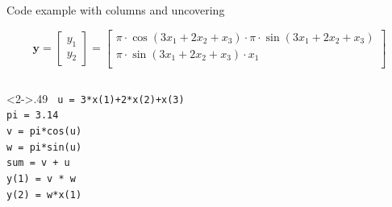 \begin{frame}{Code example with columns and uncovering} 

  \begin{equation*}
    \mathbf{y} = 
  \left[
    \begin{array}{c}
      y_1 \\ y_2
    \end{array}
  \right]
  =
  \left[\begin{array}{l}
 \pi\cdot\cos(3x_1+2x_2+x_3)\cdot\pi\cdot\sin(3x_1+2x_2+x_3)\\   
 \pi\cdot\sin(3x_1+2x_2+x_3)\cdot x_1\\   
  \end{array}\right]
  \end{equation*}

  \vfill
  \begin{columns}
    \begin{column}<2->{.49\textwidth}
      {\small\tt
        u = 3*x(1)+2*x(2)+x(3) \\
        pi = 3.14 \\
        v = pi*cos(u) \\
        w = pi*sin(u) \\
        sum = v + u \\
        y(1) = v * w \\
        y(2) = w*x(1) \\
      }
    \end{column}
%
    \begin{column}{.49\textwidth}
      {\small\tt
      }
    \end{column}
  \end{columns}

\end{frame}


